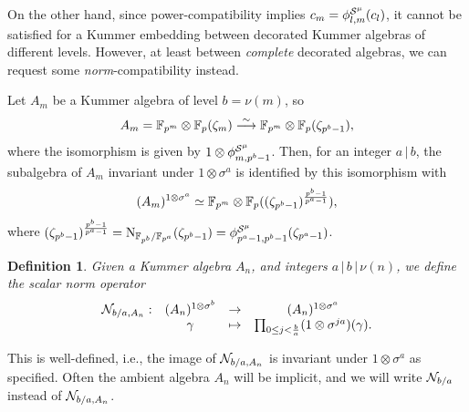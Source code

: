 \documentclass{sig-alternate}
\newtheorem{definition}[theorem]{Definition}
\begin{document}
On the other hand, 
since power-compatibility implies $c_m={\phi^{\mathcal{S}^\mu}_{{l},{m}}}(c_l)$,
it cannot be satisfied for a Kummer embedding
between decorated Kummer algebras of different levels.
However, at least between \emph{complete} decorated algebras, we can request some \emph{norm}-compatibility
instead.

Let $A_m$ be a Kummer algebra of level $b=\nu(m)$, so
\[ A_m=\mathbb{F}_{p^m}\otimes\mathbb{F}_{p}(\zeta_m)\overset{\sim}{\longrightarrow}\mathbb{F}_{p^m}\otimes\mathbb{F}_{p}(\zeta_{p^b-1}), \]
where the isomorphism is given by $1\otimes{\phi^{\mathcal{S}^\mu}_{{m},{p^b-1}}}$.
Then, for an integer $a\,|\,b$,
the subalgebra of $A_m$ invariant under $1\otimes\sigma^a$ is identified
by this isomorphism with
\[ (A_m)^{1\otimes\sigma^a}\simeq\mathbb{F}_{p^m}\otimes\mathbb{F}_{p}((\zeta_{p^b-1})^{\frac{p^b-1}{p^a-1}}), \]
where $(\zeta_{p^b-1})^{\frac{p^b-1}{p^a-1}}=\operatorname{N}_{\mathbb{F}_{p^b}/\mathbb{F}_{p^a}}(\zeta_{p^b-1})={\phi^{\mathcal{S}^\mu}_{{p^a-1},{p^b-1}}}(\zeta_{p^a-1})$.

\begin{definition}
\label{def:norm}
Given a Kummer algebra $A_n$, and integers $a\,|\,b\,|\,\nu(n)$, we define
the \emph{scalar norm} operator
\[
\begin{array}{cccc}
  \mathcal{N}_{b/a,A_n}: & (A_n)^{1\otimes\sigma^b} & \to & (A_n)^{1\otimes\sigma^a} \\
  & \gamma & \mapsto & \prod_{0\leq j<\frac{b}{a}} (1 \otimes \sigma^{ja})(\gamma).
\end{array}
\]
\end{definition}
This is well-defined, i.e., the image of $\mathcal{N}_{b/a,A_n}$ is invariant under $1\otimes\sigma^a$ as specified.
Often the ambient algebra $A_n$ will be implicit,
and we will write $\mathcal{N}_{b/a}$ instead of $\mathcal{N}_{b/a,A_n}$.
\end{document}
